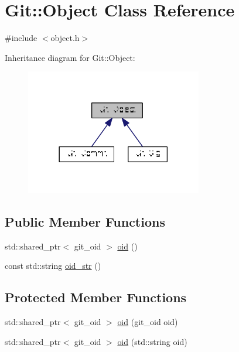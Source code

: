 \hypertarget{class_git_1_1_object}{\section{Git\-:\-:Object Class Reference}
\label{class_git_1_1_object}
}


{\ttfamily \#include $<$object.\-h$>$}



Inheritance diagram for Git\-:\-:Object\-:\nopagebreak
\begin{figure}[H]
\begin{center}
\leavevmode
\includegraphics[width=218pt]{class_git_1_1_object__inherit__graph}
\end{center}
\end{figure}
\subsection*{Public Member Functions}
\begin{DoxyCompactItemize}
\item 
std\-::shared\-\_\-ptr$<$ git\-\_\-oid $>$ \hyperlink{class_git_1_1_object_aa517de724dfef848be1cdbde1ccbfa72}{oid} ()
\item 
const std\-::string \hyperlink{class_git_1_1_object_ae8071d40eefb4bab6c54d432b413aebc}{oid\-\_\-str} ()
\end{DoxyCompactItemize}
\subsection*{Protected Member Functions}
\begin{DoxyCompactItemize}
\item 
std\-::shared\-\_\-ptr$<$ git\-\_\-oid $>$ \hyperlink{class_git_1_1_object_a77806dc2a5e3c6f4ba22a280613e0115}{oid} (git\-\_\-oid oid)
\item 
std\-::shared\-\_\-ptr$<$ git\-\_\-oid $>$ \hyperlink{class_git_1_1_object_a4ef40ad77aca900b358713b217f28b0d}{oid} (std\-::string oid)
\end{DoxyCompactItemize}


